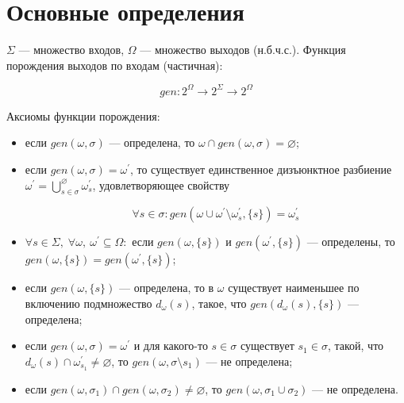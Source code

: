 \section{Основные определения}

$\Sigma$ --- множество входов, $\Omega$ --- множество выходов (н.б.ч.с.). Функция порождения
выходов по входам (частичная):

$$
gen : 2^\Omega\to 2^\Sigma\to 2^\Omega
$$

Аксиомы функции порождения:

\begin{itemize}
	\item если $gen(\omega,\sigma)$ --- определена, то $\omega\cap gen(\omega,\sigma)=\varnothing$;
	\item если $gen(\omega,\sigma)=\omega^\prime$, то существует единственное дизъюнктное разбиение $\omega^\prime=\bigcup^\varnothing_{s\in\sigma}\omega^\prime_s$, 
	удовлетворяющее свойству 

	$$\forall s\in\sigma : gen(\omega\cup\omega^\prime\setminus\omega^\prime_s,\{s\})=\omega^\prime_s$$

	\item $\forall s\in\Sigma,\; \forall\omega,\:\omega^\prime\subseteq\Omega:$ если $gen(\omega,\{s\})$ и $gen(\omega^\prime,\{s\})$ ---
	определены, то $gen(\omega,\{s\})=gen(\omega^\prime,\{s\})$;

	\item если $gen(\omega,\{s\})$ --- определена, то в $\omega$ существует наименьшее по включению подмножество $d_\omega(s)$, такое, что
	$gen(d_\omega(s), \{s\})$ --- определена;

	\item если $gen(\omega,\sigma)=\omega^\prime$ и для какого-то $s\in\sigma$ существует $s_1\in\sigma$, такой, что $d_\omega(s)\cap \omega^\prime_{s_1}\ne\varnothing$, 
	то $gen(\omega,\sigma\setminus s_1)$ --- не определена;

	\item если $gen(\omega,\sigma_1)\cap gen(\omega,\sigma_2)\ne\varnothing$, то $gen(\omega,\sigma_1\cup\sigma_2)$ --- не определена.
\end{itemize}